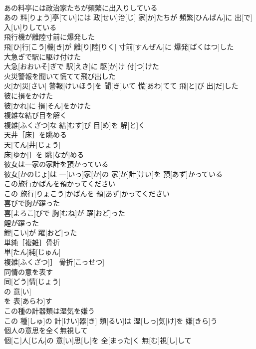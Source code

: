 \documentclass[8pt]{extreport}
\begin{document}
\begin{CJK}{UTF8}{min}
\\	あの料亭には政治家たちが頻繁に出入りしている	
\\	あの 料[りょう]亭[てい]には 政[せい]治[じ] 家[か]たちが 頻繁[ひんぱん]に 出[で]入[い]りしている
\\	飛行機が離陸寸前に爆発した	
\\	飛[ひ]行[こう]機[き]が 離[り]陸[りく] 寸前[すんぜん]に 爆発[ばくはつ]した
\\	大急ぎで駅に駆け付けた	
\\	大急[おおいそ]ぎで 駅[えき]に 駆[か]け 付[つ]けた
\\	火災警報を聞いて慌てて飛び出した	
\\	火[か]災[さい] 警報[けいほう]を 聞[き]いて 慌[あわ]てて 飛[と]び 出[だ]した
\\	彼に損をかけた	
\\	彼[かれ]に 損[そん]をかけた
\\	複雑な結び目を解く	
\\	複雑[ふくざつ]な 結[むす]び 目[め]を 解[と]く
\\	天井［床］を眺める	
\\	天[てん]井[じょう]
\\	床[ゆか]］を 眺[なが]める
\\	彼女は一家の家計を預かっている	
\\	彼女[かのじょ]は 一[いっ]家[か]の 家[か]計[けい]を 預[あず]かっている
\\	この旅行かばんを預かってください	
\\	この 旅行[りょこう]かばんを 預[あず]かってください
\\	喜びで胸が躍った	
\\	喜[よろこ]びで 胸[むね]が 躍[おど]った
\\	鯉が躍った	
\\	鯉[こい]が 躍[おど]った
\\	単純［複雑］骨折	
\\	単[たん]純[じゅん]
\\	複雑[ふくざつ]］ 骨折[こっせつ]
\\	同情の意を表す	
\\	同[どう]情[じょう]
\\	の 意[い]
\\	を 表[あらわ]す 
\\	この種の計器類は湿気を嫌う	
\\	この 種[しゅ]の 計[けい]器[き] 類[るい]は 湿[しっ]気[け]を 嫌[きら]う
\\	個人の意思を全く無視して	
\\	個[こ]人[じん]の 意[い]思[し]を 全[まった]く 無[む]視[し]して

\end{CJK}
\end{document}
